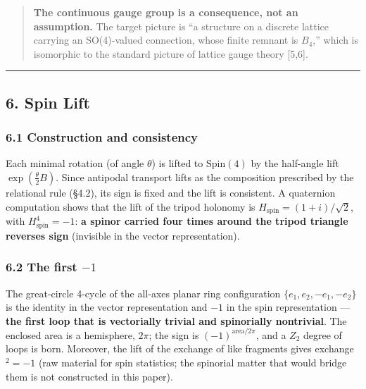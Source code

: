 \documentclass[
]{ltjsarticle}
\begin{document}
\begin{quote}
\textbf{The continuous gauge group is a consequence, not an assumption.}
The target picture is ``a structure on a discrete lattice carrying an
SO(4)-valued connection, whose finite remnant is \(B_4\),'' which is
isomorphic to the standard picture of lattice gauge theory {[}5,6{]}.
\end{quote}

\begin{center}\rule{0.5\linewidth}{0.5pt}\end{center}

\subsection{6. Spin Lift}\label{spin-lift}

\subsubsection{6.1 Construction and
consistency}\label{construction-and-consistency}

Each minimal rotation (of angle \(\theta\)) is lifted to
\(\mathrm{Spin}(4)\) by the half-angle lift \(\exp(\tfrac\theta2 B)\).
Since antipodal transport lifts as the composition prescribed by the
relational rule (§4.2), its sign is fixed and the lift is consistent. A
quaternion computation shows that the lift of the tripod holonomy is
\(H_{\mathrm{spin}}=(1+i)/\sqrt2\), with \(H_{\mathrm{spin}}^4=-1\):
\textbf{a spinor carried four times around the tripod triangle reverses
sign} (invisible in the vector representation).

\subsubsection{\texorpdfstring{6.2 The first
\(-1\)}{6.2 The first -1}}\label{the-first--1}

The great-circle 4-cycle of the all-axes planar ring configuration
\(\{e_1,e_2,-e_1,-e_2\}\) is the identity in the vector representation
and \(-1\) in the spin representation --- \textbf{the first loop that is
vectorially trivial and spinorially nontrivial}. The enclosed area is a
hemisphere, \(2\pi\); the sign is \((-1)^{\text{area}/2\pi}\), and a
\(Z_2\) degree of loops is born. Moreover, the lift of the exchange of
like fragments gives exchange\(^2=-1\) (raw material for spin
statistics; the spinorial matter that would bridge them is not
constructed in this paper).
\end{document}
